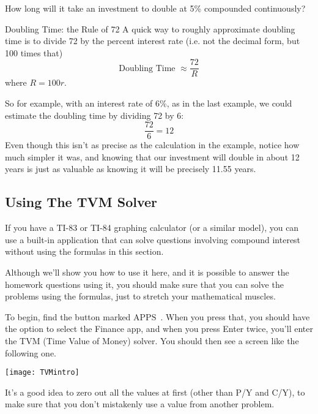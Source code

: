 \begin{try}
How long will it take an investment to double at 5\% compounded continuously?
\end{try}

\begin{proc}{Doubling Time: the Rule of 72}
A quick way to roughly approximate doubling time is to divide 72 by the percent interest rate (i.e. not the decimal form, but 100 times that)
\[\textrm{Doubling Time } \approx \dfrac{72}{R}\]
where $R = 100r$.
\end{proc}

So for example, with an interest rate of 6\%, as in the last example, we could estimate the doubling time by dividing 72 by 6:
\[\dfrac{72}{6} = 12\]
Even though this isn't as precise as the calculation in the example, notice how much simpler it was, and knowing that our investment will double in about 12 years is just as valuable as knowing it will be precisely 11.55 years.
\pagebreak

\subsection{Using The TVM Solver}
If you have a TI-83 or TI-84 graphing calculator (or a similar model), you can use a built-in application that can solve questions involving compound interest without using the formulas in this section.

Although we'll show you how to use it here, and it is possible to answer the homework questions using it, you should make sure that you can solve the problems using the formulas, just to stretch your mathematical muscles.

To begin, find the button marked $\boxed{\textrm{APPS}}$\ .  When you press that, you should have the option to select the Finance app, and when you press Enter twice, you'll enter the TVM (Time Value of Money) solver.  You should then see a screen like the following one.

\begin{center}
\texttt{[image: TVMintro]}
\end{center}

It's a good idea to zero out all the values at first (other than P/Y and C/Y), to make sure that you don't mistakenly use a value from another problem.

